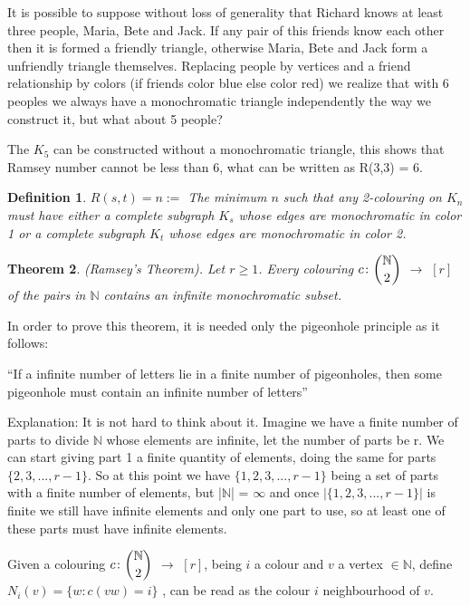 \documentclass[12pt,twoside,a4paper]{book}
\numberwithin{equation}{section}
\newtheorem{theorem}             {Theorem}[section]
\newtheorem{definition}	[theorem] {Definition}
\theoremstyle{remark}
\begin{document}
It is possible to suppose without loss of generality that Richard knows at least three people, Maria, Bete and Jack. If any pair of this friends know each other then it is formed a friendly triangle, otherwise Maria, Bete and Jack form a unfriendly triangle themselves. Replacing people by vertices and a friend relationship by colors (if friends color blue else color red) we realize that with 6 peoples we always have a monochromatic triangle independently the way we construct it, but what about 5 people?

The $K_5$ can be constructed without a monochromatic triangle, this shows that Ramsey number cannot be less than 6, what can be written as  R(3,3) = 6.
\begin{definition}\label{def:RamseyNumbers}
$R(s,t) = n :=$ The minimum $n$ such that any 2-colouring on $K_n$ must have either a complete subgraph $K_s$ whose edges are monochromatic in color 1 or a complete subgraph $K_t$ whose edges are monochromatic in color 2.
\end{definition}

\begin{theorem}\label{thm:RamseyTheorem} 
(Ramsey's Theorem). Let $r \geq 1$. Every colouring $c\colon \dbinom{\mathbb{N}}{2}$ $\rightarrow$ $[r]$ of the pairs in $\mathbb{N}$ contains an infinite monochromatic subset.
\end{theorem}

In order to prove this theorem, it is needed only the pigeonhole principle as it follows:

``If a infinite number of letters lie in a finite number of pigeonholes, then some pigeonhole must contain an infinite number of letters''

Explanation: It is not hard to think about it. Imagine we have a finite number of parts to divide $\mathbb{N}$ whose elements are infinite, let the number of parts be r. We can start giving part 1 a finite quantity of elements, doing the same for parts $\{2, 3,..., r-1\}$. So at this point we have $\{1,2,3,...,r-1\}$ being a set of parts with a finite number of elements, but |$\mathbb{N}$| = $\infty$ and once $|\{1, 2, 3,..., r-1\}|$ is finite we still have infinite elements and only one part to use, so at least one of these parts must have infinite elements.

Given a colouring $c\colon\dbinom{\mathbb{N}}{2}$ $\rightarrow$ $[r]$, being $i$ a colour and  $v$ a vertex $\in \mathbb{N}$, define $N_i(v) =\{ w: c(vw)=i\}$ , can be read as the colour $i$ neighbourhood of $v$.
\end{document}
